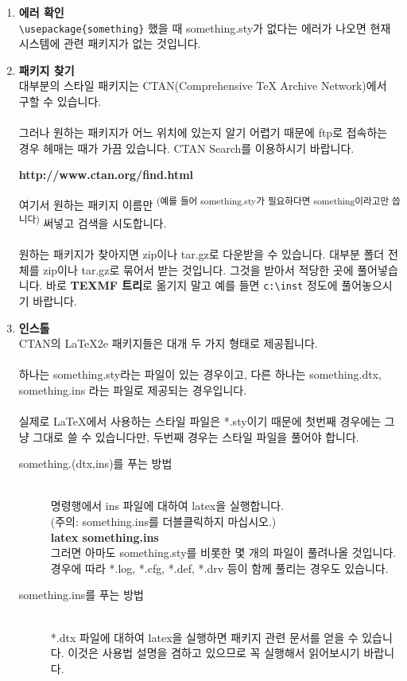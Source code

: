 	\begin{enumerate}
	\item 	\textbf{에러 확인} \\
			\verb|\usepackage{something}| 했을 때 
			something.sty가 없다는 에러가 나오면 현재 시스템에 관련 패키지가 없는 것입니다. 

	\item  	\textbf{패키지 찾기} \\
			대부분의 스타일 패키지는 CTAN(Comprehensive TeX Archive Network)에서 구할 수 있습니다. 
			\\ \\
			그러나 원하는 패키지가 어느 위치에 있는지 알기 어렵기 때문에 ftp로 접속하는 경우 헤매는 때가 가끔 있습니다.
			CTAN Search를 이용하시기 바랍니다. 			
			
			\textbf{http://www.ctan.org/find.html}
			
			여기서 원하는 패키지 이름만
			\textsuperscript{(예를 들어 something.sty가 필요하다면 something이라고만 씁니다)} 써넣고 검색을 시도합니다. 
			\\ \\
			원하는 패키지가 찾아지면 zip이나 tar.gz로 다운받을 수 있습니다. 
			대부분 폴더 전체를 zip이나 tar.gz로 묶어서 받는 것입니다.
			그것을 받아서 적당한 곳에 풀어넣습니다. 
			바로 \textbf{TEXMF 트리}로 옮기지 말고 예를 들면 \verb|c:\inst| 정도에 풀어놓으시기 바랍니다. 
	\clearpage
	\item  	\textbf{인스톨} \\
			CTAN의 LaTeX2e 패키지들은 대개 두 가지 형태로 제공됩니다. \\ \\
			하나는 something.sty라는 파일이 있는 경우이고,  
			다른 하나는 something.dtx, something.ins 라는 파일로 제공되는 경우입니다. 
			\\ \\
			실제로 LaTeX에서 사용하는 스타일 파일은 *.sty이기 때문에 
			첫번째 경우에는 그냥 그대로 쓸 수 있습니다만, 두번째 경우는 스타일 파일을 풀어야 합니다.
			\begin{description}
			\item 	[something.(dtx,ins)를 푸는 방법] \hfill \\
					명령행에서 ins 파일에 대하여 latex을 실행합니다. \\
					(주의: something.ins를 더블클릭하지 마십시오.) \\
					 \textbf{latex something.ins} \\
					그러면 아마도 something.sty를 비롯한 몇 개의 파일이 풀려나올 것입니다. 
					경우에 따라 *.log, *.cfg, *.def, *.drv 등이 함께 풀리는 경우도 있습니다.
			\item 	[something.ins를 푸는 방법] \hfill \\
					*.dtx 파일에 대하여 latex을 실행하면 패키지 관련 문서를 얻을 수 있습니다.
					이것은 사용법 설명을 겸하고 있으므로 꼭 실행해서 읽어보시기 바랍니다.
	

\end{description}
\end{enumerate}
